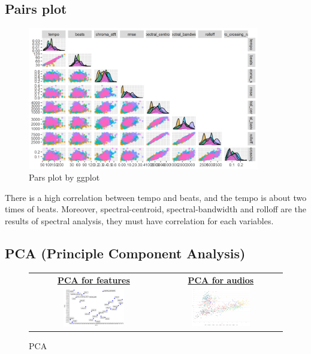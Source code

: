 \documentclass[12pt,a4paper]{article}
\begin{document}
\subsection{Pairs plot}
\begin{figure}[h]
    \begin{center}
        \includegraphics[width=0.9\textwidth]{ggpairs1.png}
    \end{center}
    \caption{Pars plot by ggplot}
\end{figure}
There is a high correlation between tempo and beats, and the tempo is about two times of beats. Moreover, spectral-centroid, spectral-bandwidth and rolloff are the results of spectral analysis, they must have correlation for each variables. 
\subsection{PCA (Principle Component Analysis)}
\begin{figure}[h]
\centering
    \begin{tabular}{c c}
        \textbf{\underline{PCA for features}} & \textbf{\underline{PCA for audios}} \\
        \includegraphics[width=0.5\textwidth]{pca_feat.png} & \includegraphics[width=0.5\textwidth]{pca.png}
    \end{tabular}
\caption{PCA}
\end{figure}
\end{document}
